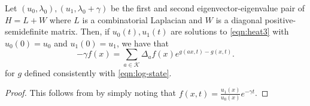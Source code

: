 \begin{cor}\label{cor:hamiltonian}
 Let $(u_0, \lambda_0),(u_1,\lambda_0+\gamma)$ be the first and second eigenvector-eigenvalue pair of $H=L+W$ where $L$ is a combinatorial Laplacian and $W$ is a diagonal positive-semidefinite matrix. Then, if $u_0(t),u_1(t)$ are solutions to \cref{eqn:heat3} with $u_0(0)=u_0$ and $u_1(0)=u_1$, we have that
 \begin{equation*}
  -\gamma f(x) = \sum_{a\in \mathcal{K}} \Delta_a f(x) e^{g(ax,t)-g(x,t)}.
 \end{equation*}
 for $g$ defined consistently with \cref{eqn:log-state}.
\end{cor}
\begin{proof}
 This follows from  by simply noting that $f(x,t)=\frac{u_1(x)}{u_0(x)}e^{-\gamma t}$.
\end{proof}

%



